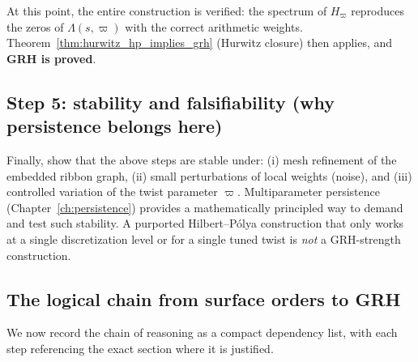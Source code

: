 \documentclass[11pt,oneside]{amsbook}
\numberwithin{equation}{section}
\theoremstyle{plain}
\theoremstyle{definition}
\theoremstyle{remark}
\begin{document}
At this point, the entire construction is verified: the spectrum of $H_\varpi$ reproduces the zeros of $\Lambda(s,\varpi)$ with the correct arithmetic weights.
Theorem~\ref{thm:hurwitz_hp_implies_grh} (Hurwitz closure) then applies, and \textbf{GRH is proved}.


\subsection{Step 5: stability and falsifiability (why persistence belongs here)}
Finally, show that the above steps are stable under:
(i) mesh refinement of the embedded ribbon graph,
(ii) small perturbations of local weights (noise), and
(iii) controlled variation of the twist parameter $\varpi$.
Multiparameter persistence (Chapter~\ref{ch:persistence}) provides a mathematically principled way to demand and test such stability.
A purported Hilbert--Pólya construction that only works at a single discretization level or for a single tuned twist is \emph{not} a GRH-strength construction.

\subsection{The logical chain from surface orders to GRH}

We now record the chain of reasoning as a compact dependency list, with each step referencing the exact section where it is justified.
\end{document}
